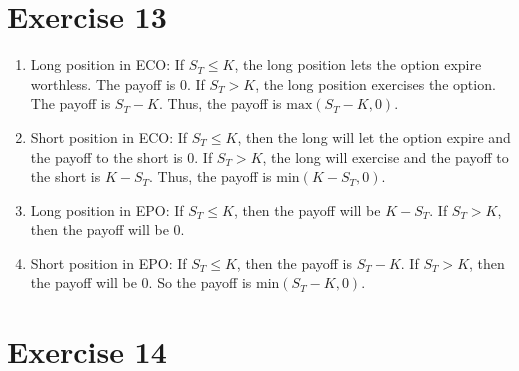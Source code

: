 \documentclass{article}
\begin{document}
\section*{Exercise 13}
\begin{flushleft}
    \begin{enumerate}
        \item Long position in ECO: If $S_T \leq K$, the long position lets the option expire worthless. The payoff is 0. If $S_T > K$, the long position exercises the option. The payoff is $S_T - K$.
            Thus, the payoff is $\text{max}(S_T-K, 0)$.
        \item Short position in ECO: If $S_T \leq K$, then the long will let the option expire and the payoff to the short is 0. If $S_T > K$, the long will exercise and the payoff to the short is $K - S_T$.
        Thus, the payoff is $\text{min}(K-S_T, 0)$.
        \item Long position in EPO: If $S_T \leq K$, then the payoff will be $K - S_T$. If $S_T > K$, then the payoff will be 0.
        \item Short position in EPO: If $S_T \leq K$, then the payoff is $S_T-K$. If $S_T > K$, then the payoff will be 0. So the payoff is $\text{min}(S_T-K, 0)$.
    \end{enumerate}
\end{flushleft}

\section*{Exercise 14}
\begin{center}
\end{center}
\end{document}
